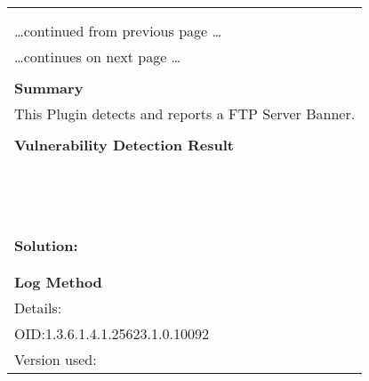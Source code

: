 \documentclass{article}
\begin{document}
\begin{longtable}{|p{}|}
\hline
\rowcolor{gvm_log}{\color{white}{Log (CVSS: 0.0) }}\\
\rowcolor{gvm_log}{\color{white}{NVT: FTP Banner Detection}}\\
\hline
\endfirsthead
\hfill\ldots continued from previous page \ldots \\
\hline
\endhead
\hline
\ldots continues on next page \ldots \\
\endfoot
\hline
\endlastfoot
\\
\textbf{Summary}\\
This Plugin detects and reports a FTP Server Banner.\\

        \hline
        \\
\textbf{Vulnerability Detection Result}\\
\rowcolor{white}{\verb=Remote FTP server banner:=}\\
\rowcolor{white}{\verb=220 FRITZ!Box7490 FTP server ready.=}\\
\rowcolor{white}{\verb=This is probably (a):=}\\
\rowcolor{white}{\verb=- AVM FRITZ!Box FTP=}\\
\rowcolor{white}{\verb=Server operating system information collected via "SYST" command:=}\\
\rowcolor{white}{\verb=215 UNIX Type: L8 Version: Linux 3.10.107=}\\
\rowcolor{white}{\verb=Server status information collected via "STAT" command:=}\\
\rowcolor{white}{\verb=211- FRITZ!Box7490 FTP server status:=}\\
\rowcolor{white}{\verb=     Connected to 192.168.178.2=}\\
\rowcolor{white}{\verb=     Waiting for user name=}\\
\rowcolor{white}{\verb=     TYPE: ASCII, FORM: Nonprint; STRUcture: File; transfer MODE: Stream=}\\
\rowcolor{white}{\verb=     No data connection=}\\
\rowcolor{white}{\verb=211 End of status=}\\

          \hline
          \\
\textbf{Solution:}\\
\\


        \hline
        \\
\textbf{Log Method}\\
Details:
\rowcolor{white}{\verb=FTP Banner Detection=}\\
OID:1.3.6.1.4.1.25623.1.0.10092\\
Version used:
\rowcolor{white}{\verb=2022-02-16T13:39:14Z=}\\
\end{longtable}
\end{document}
